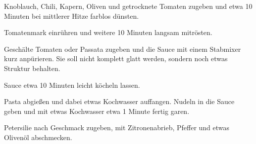 \begin{recipe}
{    \step%
    Knoblauch, Chili, Kapern, Oliven und getrocknete Tomaten zugeben und etwa 10 Minuten bei mittlerer Hitze farblos dünsten.
    
    \step%
    Tomatenmark einrühren und weitere 10 Minuten langsam mitrösten.
    
    \step%
    Geschälte Tomaten oder Passata zugeben und die Sauce mit einem Stabmixer kurz anpürieren. Sie soll nicht komplett glatt werden, sondern noch etwas Struktur behalten.
    
    \step%
    Sauce etwa 10 Minuten leicht köcheln lassen.
    
    \step%
    Pasta abgießen und dabei etwas Kochwasser auffangen. Nudeln in die Sauce geben und mit etwas Kochwasser etwa 1 Minute fertig garen.
    
    \step%
    Petersilie nach Geschmack zugeben, mit Zitronenabrieb, Pfeffer und etwas Olivenöl abschmecken.
}


\end{recipe}